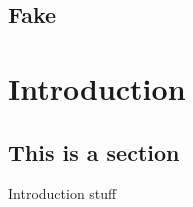 \documentclass[12pt]{memoir}
\begin{document}
\section{Fake}
\chapter{Introduction}
\section{This is a section}
Introduction stuff
\end{document}
